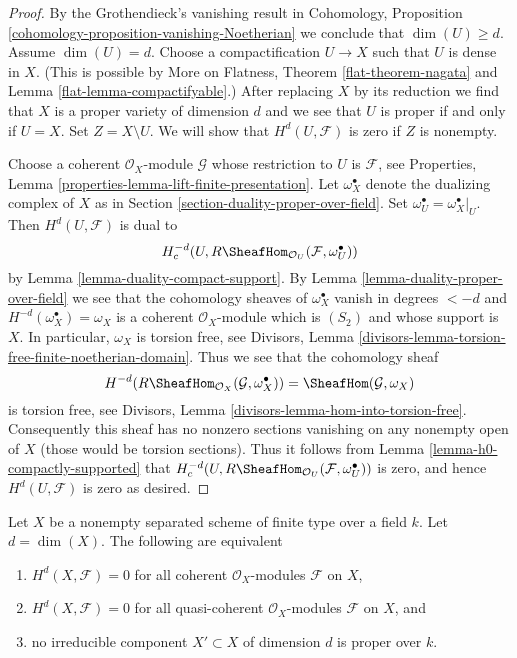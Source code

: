 \begin{proof}
By the Grothendieck's vanishing result in
Cohomology, Proposition \ref{cohomology-proposition-vanishing-Noetherian}
we conclude that $\dim(U) \geq d$.
Assume $\dim(U) = d$. Choose a compactification $U \to X$
such that $U$ is dense in $X$. (This is possible by
More on Flatness, Theorem \ref{flat-theorem-nagata} and
Lemma \ref{flat-lemma-compactifyable}.) After replacing $X$ by its
reduction we find that $X$ is a proper variety of dimension $d$
and we see that $U$ is proper if and only if $U = X$.
Set $Z = X \setminus U$. We will show that $H^d(U, \mathcal{F})$
is zero if $Z$ is nonempty.

\medskip\noindent
Choose a coherent $\mathcal{O}_X$-module
$\mathcal{G}$ whose restriction to $U$ is $\mathcal{F}$, see
Properties, Lemma \ref{properties-lemma-lift-finite-presentation}.
Let $\omega_X^\bullet$ denote the dualizing complex of $X$ as in
Section \ref{section-duality-proper-over-field}.
Set $\omega_U^\bullet = \omega_X^\bullet|_U$.
Then $H^d(U, \mathcal{F})$ is dual to
$$
H^{-d}_c(U, R\SheafHom_{\mathcal{O}_U}(\mathcal{F}, \omega_U^\bullet))
$$
by Lemma \ref{lemma-duality-compact-support}. By
Lemma \ref{lemma-duality-proper-over-field} we see that
the cohomology sheaves of $\omega_X^\bullet$ vanish in degrees $< -d$
and $H^{-d}(\omega_X^\bullet) = \omega_X$ is a coherent
$\mathcal{O}_X$-module which is $(S_2)$ and whose support is $X$.
In particular, $\omega_X$ is torsion free, see
Divisors, Lemma \ref{divisors-lemma-torsion-free-finite-noetherian-domain}.
Thus we see that the cohomology sheaf
$$
H^{-d}(R\SheafHom_{\mathcal{O}_X}(\mathcal{G}, \omega_X^\bullet)) =
\SheafHom(\mathcal{G}, \omega_X)
$$
is torsion free, see
Divisors, Lemma \ref{divisors-lemma-hom-into-torsion-free}.
Consequently this sheaf has no nonzero sections vanishing
on any nonempty open of $X$ (those would be torsion sections).
Thus it follows from Lemma \ref{lemma-h0-compactly-supported} that
$H^{-d}_c(U, R\SheafHom_{\mathcal{O}_U}(\mathcal{F}, \omega_U^\bullet))$
is zero, and hence $H^d(U, \mathcal{F})$ is zero as desired.
\end{proof}

\begin{theorem}
\label{theorem-lichtenbaum}
Let $X$ be a nonempty separated scheme of finite type over a field $k$.
Let $d = \dim(X)$. The following are equivalent
\begin{enumerate}
\item $H^d(X, \mathcal{F}) = 0$ for all coherent $\mathcal{O}_X$-modules
$\mathcal{F}$ on $X$,
\item $H^d(X, \mathcal{F}) = 0$ for all quasi-coherent $\mathcal{O}_X$-modules
$\mathcal{F}$ on $X$, and
\item no irreducible component $X' \subset X$ of dimension $d$
is proper over $k$.
\end{enumerate}
\end{theorem}

